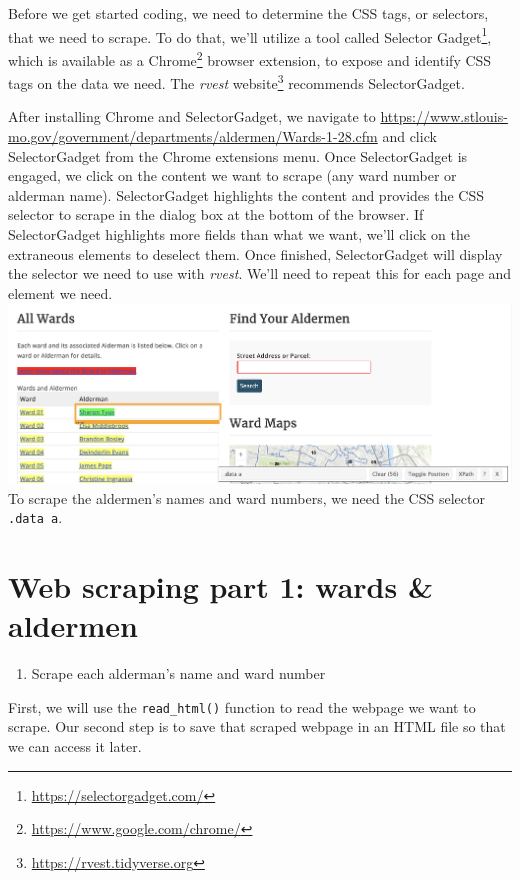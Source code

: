 \documentclass[
  krantz2]{krantz}
\providecommand{\tightlist}{%
  \setlength{\itemsep}{0pt}\setlength{\parskip}{0pt}}
\begin{document}
Before we get started coding, we need to determine the CSS tags, or selectors, that we need to scrape. To do that, we'll utilize a tool called Selector Gadget\footnote{\url{https://selectorgadget.com/}}, which is available as a Chrome\footnote{\url{https://www.google.com/chrome/}} browser extension, to expose and identify CSS tags on the data we need. The \emph{rvest} website\footnote{\url{https://rvest.tidyverse.org}} recommends SelectorGadget.

After installing Chrome and SelectorGadget, we navigate to \url{https://www.stlouis-mo.gov/government/departments/aldermen/Wards-1-28.cfm} and click SelectorGadget from the Chrome extensions menu. Once SelectorGadget is engaged, we click on the content we want to scrape (any ward number or alderman name). SelectorGadget highlights the content and provides the CSS selector to scrape in the dialog box at the bottom of the browser. If SelectorGadget highlights more fields than what we want, we'll click on the extraneous elements to deselect them. Once finished, SelectorGadget will display the selector we need to use with \emph{rvest}. We'll need to repeat this for each page and element we need.
\includegraphics{images/aldermen-selectorgadget.png}
To scrape the aldermen's names and ward numbers, we need the CSS selector \texttt{.data\ a}.

\hypertarget{scraping1}{%
\section{Web scraping part 1: wards \& aldermen}\label{scraping1}}

\begin{enumerate}
\def\labelenumi{\arabic{enumi}.}
\tightlist
\item
  Scrape each alderman's name and ward number
\end{enumerate}

First, we will use the \texttt{read\_html()} function to read the webpage we want to scrape. Our second step is to save that scraped webpage in an HTML file so that we can access it later.
\end{document}
